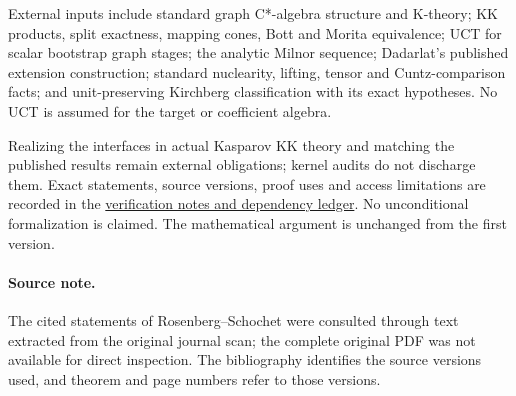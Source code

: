 \documentclass[11pt,letterpaper]{amsart}
\theoremstyle{remark}\newtheorem{remark}[theorem]{Remark}
\begin{document}
External inputs include standard graph C*-algebra structure and K-theory;
KK products, split exactness, mapping cones, Bott and Morita equivalence;
UCT for scalar bootstrap graph stages; the analytic Milnor sequence;
Dadarlat's published extension construction; standard nuclearity, lifting,
tensor and Cuntz-comparison facts; and unit-preserving Kirchberg
classification with its exact hypotheses. No UCT is assumed for the
target or coefficient algebra.

Realizing the interfaces in actual Kasparov KK theory and matching the
published results remain external obligations; kernel audits do not
discharge them. Exact statements, source versions, proof uses and access
limitations are recorded in the
\href{https://github.com/barnettcaleb1/suzuki-kirchberg-draft}{verification
notes and dependency ledger}. No unconditional formalization is claimed.
The mathematical argument is unchanged from the first version.

\paragraph{Source note.}
The cited statements of Rosenberg--Schochet
were consulted through text extracted from the original journal scan;
the complete original PDF was not available for direct inspection.
The bibliography identifies the source versions used, and theorem and page
numbers refer to those versions.
\end{document}
